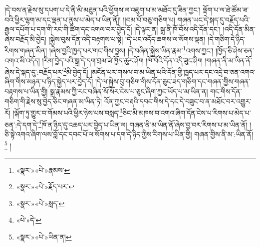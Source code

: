 །དེ་བས་ན་རྗེས་སུ་དཔག་པ་དེ་ནི་མི་མཐུན་པའི་ཕྱོགས་ལ་འཇུག་པ་མ་མཐོང་དུ་ཟིན་ཀྱང་། ལྡོག་པ་ལ་ཐེ་ཚོམ་ཟ་བའི་ཕྱིར་ལྷག་མ་དང་ལྡན་པ་ནུས་པ་མེད་པ་ཡིན་ནོ།། །།བམ་པོ་བཅུ་གཅིག་པ། གཞན་ཡང་དེ་སྐད་དུ་བརྗོད་པའི་རྒྱལ་དཔོག་པ་དག་གི་རང་གི་ཚིག་དང་འགལ་བར་བྱེད་དོ། །དེ་ལྟར་ན། སྒྲ་ནི་ཁོ་བོས་འདི་དོན་དང་། །འདི་དོན་མིན་ཞེས་བརྗོད་མི་བྱེད། །སྐྱེས་བུས་དོན་འདི་བརྟགས་པ་སྟེ། །དེ་ཡང་འདོད་ཆགས་ལ་སོགས་ལྡན། །དེ་གཅིག་དེ་ཉིད་རིགས་གཞན་མིན། །ཞེས་བྱའི་ཁྱད་པར་གང་གིས་བྱས། །དེ་བཞིན་སྐྱེས་ཡིན་རྣམ་\footnote{«སྣར་»«པེ་»རྣམས་}འགས་ཀྱང་། །ཁྱོད་ཅི་ཤེས་ཅན་འགའ་མི་འདོད། །རིག་བྱེད་པའི་སྒྲ་དེ་དག་བྲམ་ཟེ་ཁྱོད་ཚུར་ཤོག །ཁོ་བོའི་དོན་འདི་ཟུང་ཤིག །གཞན་ནི་མ་ཡིན་ནོ་ཞེས་དེ་སྐད་དུ་:བརྗོད་པར་\footnote{«སྣར་»«པེ་»རྗོད་པར་}མི་བྱེད་དོ། །མངོན་པར་གསལ་བ་མ་ཡིན་པའི་དོན་གྱི་ཁྱད་པར་དང་འདྲེ་བ་ཅན་འགའ་ཞིག་གིས་མཉན་པ་ཉིད་སྐྱེད་པར་བྱེད་དོ། །དེ་ལ་སྐྱེས་བུ་གཅིག་གིས་དོན་ཅུང་ཟད་གཅིག་དང་གཞན་གྱིས་གཞན་བརྟགས་པ་ཡིན་གྱི། སྒྲ་རྣམས་ཀྱི་རང་བཞིན་སོ་སོར་ངེས་པ་ཅུང་ཞིག་ཀྱང་ཡོད་པ་མ་ཡིན་ན། གང་གིས་དོན་གཅིག་གི་རྗེས་སུ་བྱེད་ཅིང་གཞན་མ་ཡིན་ཏེ། འོན་ཀྱང་བརྡའི་དབང་གིས་དེ་དང་དེ་བཟུང་བ་ན་མཐོང་བར་འགྱུར་རོ། །ལྐོག་ཏུ་གྱུར་བ་གོམས་པའི་ཕྱིར་ཉེས་པས་བསླད་\footnote{«སྣར་»«པེ་»སླད་}ཅིང་མི་མཁས་བ་འགའ་ཞིག་དོན་ངེས་པ་རིགས་པ་མེད་པ་ཅན་:དེ་དག་དེ་\footnote{«པེ་»དེ་}ཁོ་ན་ཉིད་དུ་འཆད་པར་བྱེད་པ་ཡིན་ལ། གཞན་ནི་མ་ཡིན་ནོ་ཞེས་བྱ་བར་རིགས་པ་མ་ཡིན་ནོ། །ཅི་སྟེ་འགའ་ཞིག་ལས་བློ་དང་དབང་པོ་ལ་སོགས་པ་དག་དེ་ཉིད་ཀྱིས་རིགས་པ་ཡིན་གྱི། གཞན་གྱིས་ནི་མ་:ཡིན་ནོ།\footnote{«སྣར་»«པེ་»ཡིན་ན།} །
